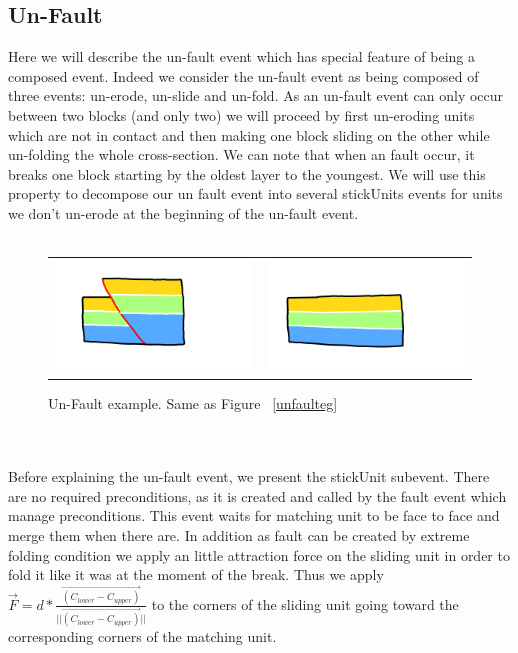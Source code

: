 \documentclass[12pt, a4paper]{report} %
\begin{document}
\subsection{Un-Fault}
\label{sub:unfault}
Here we will describe the un-fault event which has special feature of being a composed event. Indeed we consider the un-fault event as being composed of three events: un-erode, un-slide and un-fold. As an un-fault event can only occur between two blocks (and only two) we will proceed by first un-eroding units which are not in contact and then making one block sliding on the other while un-folding the whole cross-section. We can note that when an fault occur, it breaks one block starting by the oldest layer to the youngest. We will use this property to decompose our un fault event into several stickUnits events for units we don't un-erode at the beginning of the un-fault event.\\\\
\begin{figure}[H]
\centering
\begin{tabular}{@{}cc@{}}
\includegraphics[width=.45\textwidth]{unFaultDescription0.png}&
\includegraphics[width=.45\textwidth]{unFaultDescription1.png}\\
\end{tabular}
\caption{Un-Fault example. Same as Figure ~\ref{unfaulteg}}
\label{unfaulteg2}
\end{figure}\\\\
Before explaining the un-fault event, we present the stickUnit subevent. There are no required preconditions, as it is created and called by the fault event which manage preconditions. This event waits for matching unit to be face to face and merge them when there are. In addition as fault can be created by extreme folding condition we apply an little attraction force on the sliding unit in order to fold it like it was at the moment of the break. Thus we apply $\overrightarrow{F} = d*\frac{\overrightarrow{(C_{lower} - C_{upper})} }{||\overrightarrow{(C_{lower} - C_{upper})}||}$ to the corners of the sliding unit going toward the corresponding corners of the matching unit.\\\\
\end{document}
